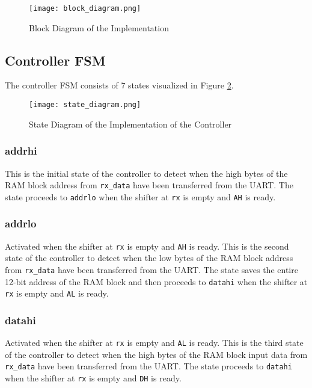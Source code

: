 \documentclass[paper=usletter, fontsize=12pt]{article}
\begin{document}
        \begin{figure}[ht]
            \begin{center}
                \texttt{[image: block\_diagram.png]}
                \caption{Block Diagram of the Implementation}
                \label{fig:block}
            \end{center}
        \end{figure}

        \subsection{Controller FSM} The controller FSM consists of 7 states
        visualized in Figure \ref{fig:states}.

            \begin{figure}[ht]
                \begin{center}
                    \texttt{[image: state\_diagram.png]}
                    \caption{State Diagram of the Implementation of the
                    Controller}
                    \label{fig:states}
                \end{center}
            \end{figure}

            \subsubsection{addrhi} This is the initial state of the controller
            to detect when the high bytes of the RAM block address from
            \texttt{rx\_data} have been transferred from the UART. The state
            proceeds to \texttt{addrlo} when the shifter at \texttt{rx} is
            empty and \texttt{AH} is ready.

            \subsubsection{addrlo} Activated when the shifter at \texttt{rx} is
            empty and \texttt{AH} is ready. This is the second state of the
            controller to detect when the low bytes of the RAM block address
            from \texttt{rx\_data} have been transferred from the UART. The
            state saves the entire 12-bit address of the RAM block and then
            proceeds to \texttt{datahi} when the shifter at \texttt{rx} is
            empty and \texttt{AL} is ready.

            \subsubsection{datahi} Activated when the shifter at \texttt{rx} is
            empty and \texttt{AL} is ready. This is the third state of the
            controller to detect when the high bytes of the RAM block input
            data from \texttt{rx\_data} have been transferred from the UART.
            The state proceeds to \texttt{datahi} when the shifter at
            \texttt{rx} is empty and \texttt{DH} is ready.
\end{document}
